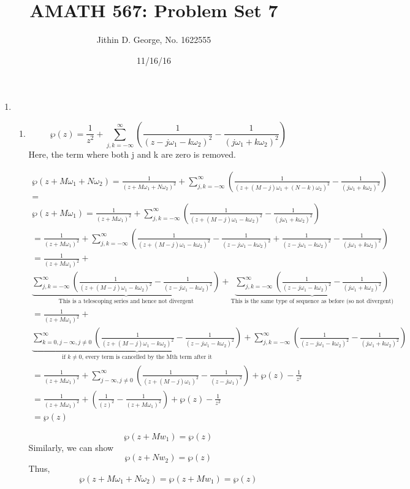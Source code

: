 \documentclass[a4paper]{article}
\title{AMATH 567: Problem Set 7}
\author{Jithin D. George, No. 1622555}
\date{11/16/16}
\begin{document}
\maketitle
\begin{enumerate}
	
	\item
	\begin{enumerate}
		\item 
		\[
				\wp(z)=\frac{1}{z^2}+\sum_{j,k=-\infty}^\infty \left(\frac{1}{(z-j
					\omega_1-k \omega_2)^2}-\frac{1}{(j \omega_1+k \omega_2)^2}\right)		\]	
				Here, the term where both j and k are zero is removed.	                         
			\begin{center}             
			\begin{gather*}
		\wp(z+M \omega_1+N \omega_2)=\frac{1}{(z+M \omega_1+N \omega_2)^2}+\sum_{j,k=-\infty}^\infty \left(\frac{1}{(z+(M-j)
			\omega_1+(N-k) \omega_2)^2}-\frac{1}{(j \omega_1+k \omega_2)^2}\right)	
		\\= \\	
	\wp(z+M \omega_1)=\frac{1}{(z+M \omega_1)^2}+\sum_{j,k=-\infty}^\infty \left(\frac{1}{(z+(M-j)
		\omega_1-k \omega_2)^2} -\frac{1}{(j \omega_1+k \omega_2)^2}\right)	
		\\= \frac{1}{(z+M \omega_1)^2}+\sum_{j,k=-\infty}^\infty \left(\frac{1}{(z+(M-j)
			\omega_1-k \omega_2)^2} -\frac{1}{(z-j
			\omega_1-k \omega_2)^2}+\frac{1}{(z-j
			\omega_1-k \omega_2)^2}-\frac{1}{(j \omega_1+k \omega_2)^2}\right)	
		\\= \frac{1}{(z+M \omega_1)^2}+\\\underbrace{\sum_{j,k=-\infty}^\infty \left(\frac{1}{(z+(M-j)
			\omega_1-k \omega_2)^2} -\frac{1}{(z-j
			\omega_1-k \omega_2)^2}\right)}_\text{This is a telescoping series and hence not divergent}+\underbrace{\sum_{j,k=-\infty}^\infty \left(\frac{1}{(z-j
			\omega_1-k \omega_2)^2}-\frac{1}{(j \omega_1+k \omega_2)^2}\right)}_\text{This is the same type of sequence as before (so not divergent)} 
	\\=	\frac{1}{(z+M \omega_1)^2}+\\\underbrace{\sum_{k=0,j-\infty, j\neq 0}^\infty \left(\frac{1}{(z+(M-j)
			\omega_1-k \omega_2)^2} -\frac{1}{(z-j
			\omega_1-k \omega_2)^2}\right)}_\text{if $k\neq0$, every term is cancelled by the Mth term after it} 	+\sum_{j,k=-\infty}^\infty \left(\frac{1}{(z-j
			\omega_1-k \omega_2)^2}-\frac{1}{(j \omega_1+k \omega_2)^2}\right)	
	\\=	\frac{1}{(z+M \omega_1)^2}+\sum_{j-\infty, j\neq 0}^\infty \left(\frac{1}{(z+(M-j)
			\omega_1)^2} -\frac{1}{(z-j
			\omega_1)^2}\right)	+\wp(z) - \frac{1}{z^2}		
	\\=	\frac{1}{(z+M \omega_1)^2}+ \left(\frac{1}{(z)^2} -\frac{1}{(z+M
		\omega_1)^2}\right)	+\wp(z) - \frac{1}{z^2}	
\\	=\wp(z)
								\end{gather*} 
						\end{center}
			\[\wp(z+Mw_1)					=\wp(z)\]
			Similarly, we can show \[\wp(z+Nw_2)					=\wp(z)\]
			Thus,
			\[	\wp(z+M \omega_1+N \omega_2)= \wp(z+Mw_1)					=\wp(z)\]
		

\end{enumerate}
\end{enumerate}
\end{document}
